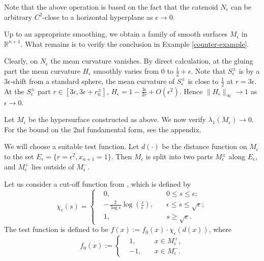 \documentclass{amsart}
\numberwithin{equation}{section}
\theoremstyle{remark}
\renewcommand{\(}{\left(}
\renewcommand{\)}{\right)}
\renewcommand{\~}{\tilde}
\renewcommand{\-}{\overline}
\newcommand{\R}{\mathbb{R}}
\newcommand{\e}{\epsilon}
\begin{document}
Note that the above operation is based on the fact that the catenoid $N_\e$ can be arbitrary $C^2$-close to a horizontal hyperplane as $\e\to 0$.

Up to an appropriate smoothing, we obtain a family of smooth surfaces $M_\e$ in $\R^{n+1}$. What remains is to verify the conclusion in Example \ref{counter-example}.

Clearly, on $N_\e$ the mean curvature vanishes. By direct calculation, at the gluing part the mean curvature $H_\e$ smoothly varies from $0$ to $\frac{1}{2}+\epsilon$. Note that $S_\e^{\pm}$ is by a $3\e$-shift from a standard sphere, the mean curvature of $S_\e^{\pm}$ is close to $\frac{1}{2}$ at $r=3\e$.  At the $S_\e^{\pm}$ part $r\in [3\e,3\e+r_0^\pm]$, $H_\e=1-\frac{3\e}{2r}+O(\e^2)$. Hence $\|H_\e\|_\infty\to 1$ as $\e\to 0$.

Let $M_\e$ be the hypersurface constructed as above. We now verify $\lambda_1(M_\e)\to 0$. For the bound on the 2nd fundamental form, see the appendix.

We will choose a suitable test function. Let $d(\cdot)$ be the distance function on $M_\e$ to the set $E_\e=\{r=\e^2,x_{n+1}=1\}$.
Then $M_\e$ is split into two parts $M_\e^\pm$ along $E_\e$, and $M_\e^+$ lies outside of $M_\e^-$.

Let us consider a cut-off function from \cite[Propsition 1.3.1]{Courtois1987}, which is defined by
\begin{equation}\label{cut-off-function}
\chi_\e (s)=\left\{ \begin{aligned}
&0, \quad  & 0\leq s \leq \e;\\
&-\frac{2}{\log \e}\log(\frac{s}{\e}), \quad &\e \leq s \leq \sqrt{\e};\\
&1, \quad &s \geq \sqrt{\e}.
\end{aligned} \right.
\end{equation}
The test function is defined to be $f(x):=f_0(x) \cdot \chi_{\e}(d(x))$, where
$$
f_0(x):=\left\{ \begin{aligned}
&1, \quad  &x\in M_\e^{+},\\
&-1,   \quad  &x \in  M_\e^{-}.
\end{aligned} \right.
$$
\end{document}

